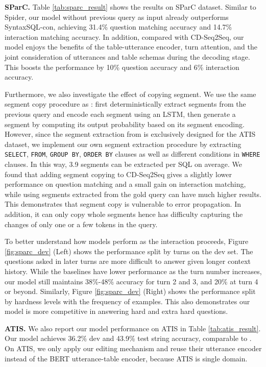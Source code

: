 \documentclass[11pt,a4paper]{article}
\newcommand{\syncon}{SyntaxSQL-con}
\begin{document}
\textbf{SParC.}
Table \ref{tab:sparc_result} shows the results on SParC dataset.
Similar to Spider, our model without previous query as input already outperforms \syncon{}, achieving 31.4\% question matching accuracy and 14.7\% interaction matching accuracy.
In addition, compared with CD-Seq2Seq, our model enjoys the benefits of the table-utterance encoder, turn attention, and the joint consideration of utterances and table schemas during the decoding stage.
This boosts the performance by 10\% question accuracy and 6\% interaction accuracy.

Furthermore, we also investigate the effect of copying segment.
We use the same segment copy procedure as : first deterministically extract segments from the previous query and encode each segment using an LSTM, then generate a segment by computing its output probability based on its segment encoding.
However, since the segment extraction from  is exclusively designed for the ATIS dataset, we implement our own segment extraction procedure by extracting \texttt{SELECT}, \texttt{FROM}, \texttt{GROUP BY}, \texttt{ORDER BY} clauses as well as different conditions in \texttt{WHERE} clauses.
In this way, 3.9 segments can be extracted per SQL on average.
We found that adding segment copying to CD-Seq2Seq gives a slightly lower performance on question matching and a small gain on interaction matching, while using segments extracted from the gold query can have much higher results.
This demonstrates that segment copy is vulnerable to error propagation. In addition, it can only copy whole segments hence has difficulty capturing the changes of only one or a few tokens in the query.


To better understand how models perform as the interaction proceeds, Figure \ref{fig:sparc_dev} (Left) shows the performance split by turns on the dev set.
The questions asked in later turns are more difficult to answer given longer context history.
While the baselines have lower performance as the turn number increases, our model still maintains 38\%-48\% accuracy for turn 2 and 3, and 20\% at turn 4 or beyond.
Similarly, Figure \ref{fig:sparc_dev} (Right) shows the performance split by hardness levels with the frequency of examples.
This also demonstrates our model is more competitive in answering hard and extra hard questions.

\textbf{ATIS.}
We also report our model performance on ATIS in Table \ref{tab:atis_result}.
Our model achieves 36.2\% dev and 43.9\% test string accuracy, comparable to .
On ATIS, we only apply our editing mechanism and reuse their utterance encoder instead of the BERT utterance-table encoder, because ATIS is single domain.
\end{document}
